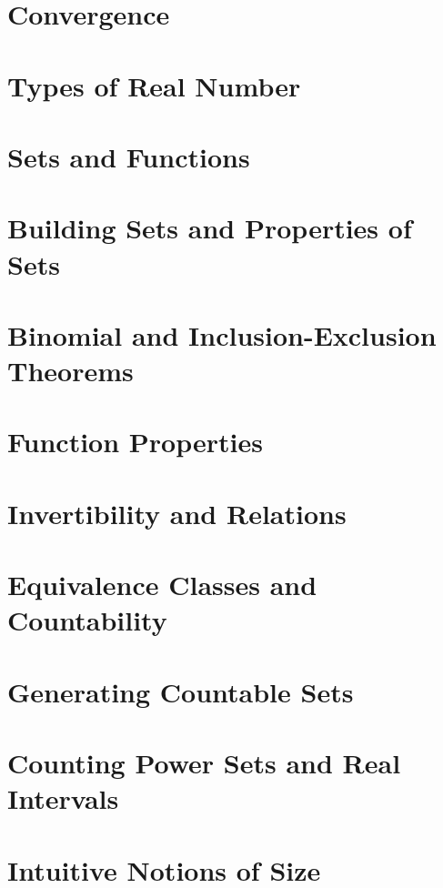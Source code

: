 \documentclass{article}
\begin{document}
\section{Convergence}

\section{Types of Real Number}

\section{Sets and Functions}

\section{Building Sets and Properties of Sets}

\section{Binomial and Inclusion-Exclusion Theorems}

\section{Function Properties}

\section{Invertibility and Relations}

\section{Equivalence Classes and Countability}

\section{Generating Countable Sets}

\section{Counting Power Sets and Real Intervals}

\section{Intuitive Notions of Size}

\end{document}
